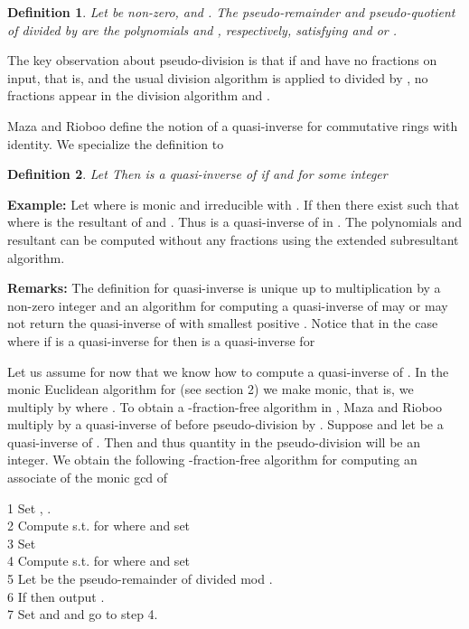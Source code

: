\documentclass[10pt]{article}
\newtheorem{definition}{Definition}
\begin{document}
\begin{definition}
Let  be non-zero, 
 and .
The {\it pseudo-remainder} and {\it pseudo-quotient} of  divided by 
are the polynomials  and , respectively, satisfying
 and  or .
\end{definition}
The key observation about pseudo-division is that if  and  have
no fractions on input, that is,  and the
usual division algorithm is applied to  divided by , no fractions
appear in the division algorithm and .

Maza and Rioboo define the notion of a quasi-inverse for commutative
rings with identity.  We specialize the definition to 
\begin{definition}
Let   Then  is a
{\it quasi-inverse} of  if  and 
for some integer 
\end{definition}
\noindent
{\bf Example:} Let  where  is monic and
irreducible with .  If  then there exist
 such that  where  is the resultant
of  and .  Thus  is a quasi-inverse of  in .
The polynomials  and resultant  can be computed without any fractions
using the extended subresultant algorithm.

\bigskip
\noindent
{\bf Remarks:} The definition for quasi-inverse is unique up to multiplication
by a non-zero integer and an algorithm for computing a quasi-inverse of  may
or may not return the quasi-inverse of  with smallest positive .
Notice that in the case where  if  is a quasi-inverse
for  then  is a quasi-inverse for 

\bigskip
Let us assume for now that we know how to compute a quasi-inverse of .
In the monic Euclidean algorithm for  (see section 2) we make  monic,
that is, we multiply  by  where .  To obtain
a -fraction-free algorithm in , Maza and Rioboo multiply  by a
quasi-inverse of  before pseudo-division by .
Suppose  and let  be a quasi-inverse of .
Then  and  thus
quantity  in the pseudo-division will be an integer.
We obtain the following -fraction-free algorithm for computing an
associate of the monic gcd  of 

\bigskip
\noindent
\hspace*{5mm} 1  Set , . \\
\hspace*{5mm} 2  Compute  s.t.  for  where  and set  \\
\hspace*{5mm} 3  Set  \\
\hspace*{5mm} 4  Compute  s.t.  for  where  and set  \\
\hspace*{5mm} 5  \hspace*{5mm} Let  be the pseudo-remainder of  divided  mod . \\
\hspace*{5mm} 6  \hspace*{5mm} If  then output . \\
\hspace*{5mm} 7  \hspace*{5mm} Set  and  and go to step 4.
\end{document}
